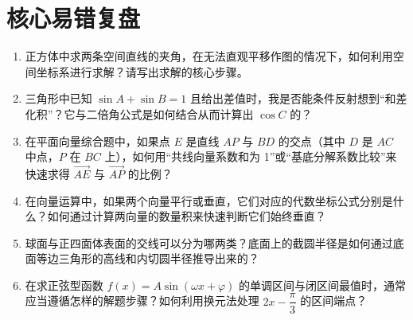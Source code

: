 \documentclass[11pt,a4paper]{ctexart}
\begin{document}
\section{核心易错复盘}
\begin{enumerate}[label=\arabic*. , leftmargin=2em, itemsep=1.5em]
  \item 正方体中求两条空间直线的夹角，在无法直观平移作图的情况下，如何利用空间坐标系进行求解？请写出求解的核心步骤。
  
  \vspace{0.8cm}
  
  \item 三角形中已知 \(\sin A+\sin B = 1\) 且给出差值时，我是否能条件反射想到“和差化积”？它与二倍角公式是如何结合从而计算出 \(\cos C\) 的？
  
  \vspace{0.8cm}
  
  \item 在平面向量综合题中，如果点 \(E\) 是直线 \(AP\) 与 \(BD\) 的交点（其中 \(D\) 是 \(AC\) 中点，\(P\) 在 \(BC\) 上），如何用“共线向量系数和为 1”或“基底分解系数比较”来快速求得 \(\overrightarrow{AE}\) 与 \(\overrightarrow{AP}\) 的比例？
  
  \vspace{0.8cm}
  
  \item 在向量运算中，如果两个向量平行或垂直，它们对应的代数坐标公式分别是什么？如何通过计算两向量的数量积来快速判断它们始终垂直？
  
  \vspace{0.8cm}
  
  \item 球面与正四面体表面的交线可以分为哪两类？底面上的截圆半径是如何通过底面等边三角形的高线和内切圆半径推导出来的？
  
  \vspace{0.8cm}
  
  \item 在求正弦型函数 \(f(x) = A\sin(\omega x+\varphi)\) 的单调区间与闭区间最值时，通常应当遵循怎样的解题步骤？如何利用换元法处理 \(2x - \dfrac{\pi}{3}\) 的区间端点？
  
  \vspace{0.8cm}
\end{enumerate}
\end{document}
